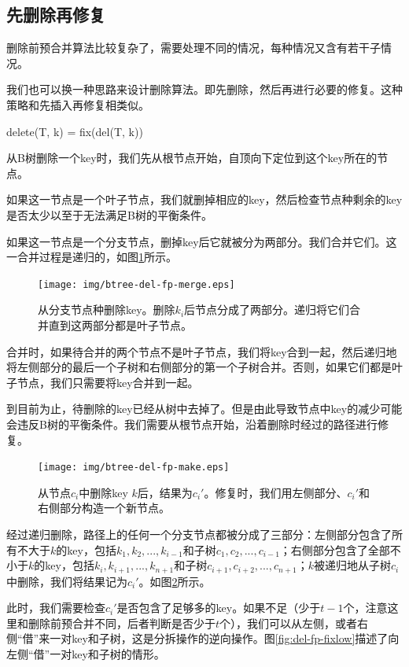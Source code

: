 \documentclass{ctexart}
\begin{document}
\subsection{先删除再修复}

删除前预合并算法比较复杂了，需要处理不同的情况，每种情况又含有若干子情况。

我们也可以换一种思路来设计删除算法。即先删除，然后再进行必要的修复。这种策略和先插入再修复相类似。

\be
delete(T, k) = fix(del(T, k))
\ee

从B树删除一个key时，我们先从根节点开始，自顶向下定位到这个key所在的节点。

如果这一节点是一个叶子节点，我们就删掉相应的key，然后检查节点种剩余的key是否太少以至于无法满足B树的平衡条件。

如果这一节点是一个分支节点，删掉key后它就被分为两部分。我们合并它们。这一合并过程是递归的，如图\ref{fig:del-fp-merge}所示。

\begin{figure}[htbp]
  \centering
  \texttt{[image: img/btree-del-fp-merge.eps]}
  \caption{从分支节点种删除key。删除$k_i$后节点分成了两部分。递归将它们合并直到这两部分都是叶子节点。} \label{fig:del-fp-merge}
\end{figure}

合并时，如果待合并的两个节点不是叶子节点，我们将key合到一起，然后递归地将左侧部分的最后一个子树和右侧部分的第一个子树合并。否则，如果它们都是叶子节点，我们只需要将key合并到一起。

到目前为止，待删除的key已经从树中去掉了。但是由此导致节点中key的减少可能会违反B树的平衡条件。我们需要从根节点开始，沿着删除时经过的路径进行修复。

\begin{figure}[htbp]
  \centering
  \texttt{[image: img/btree-del-fp-make.eps]}
  \caption{从节点$c_i$中删除key $k$后，结果为$c_i'$。修复时，我们用左侧部分、$c_i'$和右侧部分构造一个新节点。}
  \label{fig:del-fp-make}
\end{figure}

经过递归删除，路径上的任何一个分支节点都被分成了三部分：左侧部分包含了所有不大于$k$的key，包括$k_1, k_2, ..., k_{i-1}$和子树$c_1, c_2, ..., c_{i-1}$；右侧部分包含了全部不小于$k$的key，包括$k_i, k_{i+1}, ..., k_{n+1}$和子树$c_{i+1}, c_{i+2}, ..., c_{n+1}$；$k$被递归地从子树$c_i$中删除，我们将结果记为$c_i'$。如图\ref{fig:del-fp-make}所示。

此时，我们需要检查$c_i'$是否包含了足够多的key。如果不足（少于$t-1$个，注意这里和删除前预合并不同，后者判断是否少于$t$个），我们可以从左侧，或者右侧“借”来一对key和子树，这是分拆操作的逆向操作。图\ref{fig:del-fp-fixlow}描述了向左侧“借”一对key和子树的情形。
\end{document}
